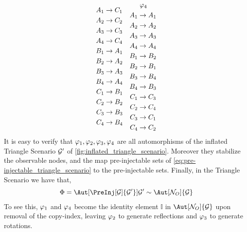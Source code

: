 \documentclass[aps, 10pt, english, twoside, pra, nofootinbib, longbibliography]{revtex4-1}
\begin{document}
\begin{equation*}
\begin{aligned}[c]
    A_1 &\to C_1 \\A_2 &\to C_2 \\A_3 &\to C_3 \\A_4 &\to C_4 \\B_1 &\to A_1 \\B_2 &\to A_2 \\B_3 &\to A_3 \\B_4 &\to A_4 \\C_1 &\to B_1 \\C_2 &\to B_2 \\C_3 &\to B_3 \\C_4 &\to B_4
    \end{aligned}
    \quad
    \begin{aligned}[c]
    &\hspace{1mm}\varphi_4 \\
    A_1 &\to A_1 \\A_2 &\to A_2 \\A_3 &\to A_3 \\A_4 &\to A_4 \\B_1 &\to B_2 \\B_2 &\to B_1 \\B_3 &\to B_4 \\B_4 &\to B_3 \\C_1 &\to C_3 \\C_2 &\to C_4 \\C_3 &\to C_1 \\C_4 &\to C_2
    \end{aligned}
    \end{equation*}
    It is easy to verify that $\varphi_1, \varphi_2, \varphi_3, \varphi_4$ are all automorphisms of the inflated Triangle Scenario $\mathcal{G}'$ of \cref{fig:inflated_triangle_scenario}. Moreover they stabilize the observable nodes, and the map pre-injectable sets of \cref{eq:pre-injectable_triangle_scenario} to the pre-injectable sets. Finally, in the Triangle Scenario we have that,
    \[ \gp = \Aut[\PreInj[\graph]{\graph'}]{\graph'} \sim \Aut[\nodes_O]{\graph} \]
    To see this, $\varphi_1$ and $\varphi_4$ become the identity element $\mathbb{I}$ in $\Aut[\nodes_O]{\graph}$ upon removal of the copy-index, leaving $\varphi_2$ to generate reflections and $\varphi_3$ to generate rotations.
\end{document}

